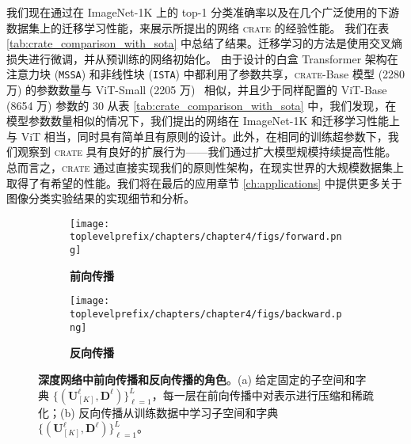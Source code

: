 \documentclass[../../book-main_zh.tex]{subfiles}
\begin{document}
我们现在通过在 ImageNet-1K 上的 top-1 分类准确率以及在几个广泛使用的下游数据集上的迁移学习性能，来展示所提出的网络 \textsc{crate} 的经验性能。
我们在表 \ref{tab:crate_comparison_with_sota} 中总结了结果。迁移学习的方法是使用交叉熵损失进行微调，并从预训练的网络初始化。
由于设计的白盒 Transformer 架构在注意力块 (\texttt{MSSA}) 和非线性块 (\texttt{ISTA}) 中都利用了参数共享，\textsc{crate}{-Base} 模型 (2280 万)
的参数数量与 ViT-Small (2205 万)~\cite{dosovitskiy2020image} 相似，并且少于同样配置的 ViT-Base (8654 万) 参数的 30%
从表 \ref{tab:crate_comparison_with_sota} 中，我们发现，在模型参数数量相似的情况下，我们提出的网络在 ImageNet-1K 和迁移学习性能上与 ViT 相当，同时具有简单且有原则的设计。此外，在相同的训练超参数下，我们观察到 \textsc{crate} 具有良好的扩展行为——我们通过扩大模型规模持续提高性能。总而言之，\textsc{crate} 通过直接实现我们的原则性架构，在现实世界的大规模数据集上取得了有希望的性能。我们将在最后的应用章节 \ref{ch:applications} 中提供更多关于图像分类实验结果的实现细节和分析。

\begin{figure}[t]
    \begin{subfigure}[t]{0.48\textwidth}
        \centering
        \texttt{[image: \\toplevelprefix/chapters/chapter4/figs/forward.png]}
        \caption{\bf 前向传播}
    \end{subfigure}
    \hfill
    \begin{subfigure}[t]{0.48\textwidth}
        \centering
        \texttt{[image: \\toplevelprefix/chapters/chapter4/figs/backward.png]}
        \caption{\bf 反向传播}
    \end{subfigure}
    \caption{\small {\bf 深度网络中前向传播和反向传播的角色}。(a) 给定固定的子空间和字典 $\{(\bm U_{[K]}^{\ell}, \bm D^{\ell})\}_{\ell=1}^L$，每一层在前向传播中对表示进行压缩和稀疏化；(b) 反向传播从训练数据中学习子空间和字典 $\{(\bm U_{[K]}^{\ell}, \bm D^{\ell})\}_{\ell=1}^L$。}
    \label{fig:forward-backward}
\end{figure}
\end{document}
